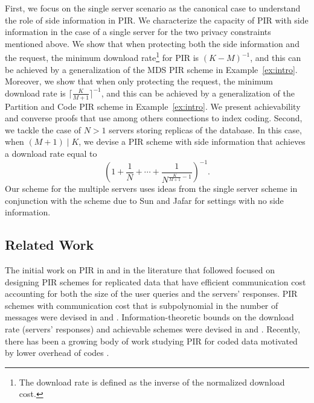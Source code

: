 \documentclass[letterpaper, 10 pt, conference]{ieeeconf}
\newcommand\salim[1]{\add[salim]{#1}}
\begin{document}
First, we focus on the  single server scenario as the canonical case to understand the role of side information in PIR. We  characterize the   capacity of PIR with side information in the case of a single server for the two privacy constraints mentioned above. We show that when protecting both the side information and the request, the minimum download rate\footnote{The download rate is defined as the inverse of the normalized download cost.} for PIR is $(K-M)^{-1}$, and this can be achieved by a generalization of the MDS PIR scheme in Example~\ref{ex:intro}. Moreover, we show that when only protecting the request, the minimum download rate is $\lceil \frac{K}{M+1}\rceil^{-1}$, and this can be achieved by a generalization of the Partition and Code PIR scheme in Example~\ref{ex:intro}. We present achievability and converse proofs that use among others connections to index coding. Second, we tackle the case of $N>1$  servers storing replicas of the database. In this case, when $(M+1)\mid K$, we devise a PIR scheme with side information that achieves a download rate equal to  $$\left(1 + \frac{1}{N} + \cdots + \frac{1}{N^{\frac{K}{M+1}-1}}\right)^{-1}.$$ Our scheme for the multiple servers uses ideas from the single server scheme in conjunction with the scheme due to Sun and Jafar \cite{sun2016capacitynoncol} for settings with no side information.





\subsection{Related Work} \label{sec:related-work}
The initial work on PIR in \cite{Chor:PIR1995,chor1998private} and in the literature that followed  focused on  designing PIR schemes for replicated data that have   efficient  communication cost accounting  for  both the size of the user queries and the servers' responses. PIR schemes with communication cost that is subpolynomial in the number of messages were devised in \cite{beimel2002breaking} and \cite{dvir20162}. Information-theoretic bounds on the download rate (servers' responses) and achievable schemes were  devised in \cite{sun2016capacitynoncol} and \cite{sun2016capacity}. 
Recently, there has been   a growing body of work studying   PIR for coded data motivated by lower overhead of codes
 \cite{shah2014one, chan2014private, tajeddine2016private, extended, banawan2016capacity, fazeli2015pir, blackburn2016pir, freij2016private,tajeddine2017private1,tajeddine2017private2}.
\end{document}
